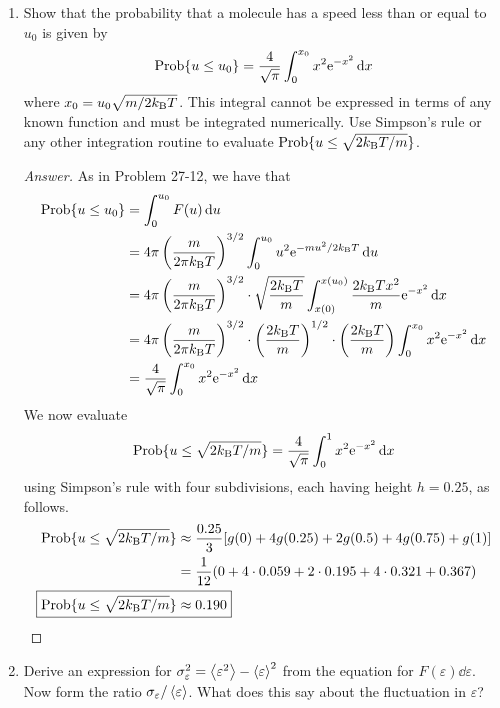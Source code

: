 \documentclass[../psets.tex]{subfiles}
\begin{document}
\begin{enumerate}[label={\textbf{27-\arabic*.}},leftmargin=3.5em]
\begin{proof}[Answer]
\begin{align*}
            \Aboxed{\sigma &= \SI{7.22e8}{\per\second}}
        \end{align*}
    \end{proof}
    \setcounter{enumi}{23}
    \item Show that the probability that a molecule has a speed less than or equal to $u_0$ is given by
    \begin{equation*}
        \Prob\{u\leq u_0\} = \frac{4}{\sqrt{\pi}}\int_0^{x_0}x^2\e[-x^2]\dd{x}
    \end{equation*}
    where $x_0=u_0\sqrt{m/2\kB T}$. This integral cannot be expressed in terms of any known function and must be integrated numerically. Use Simpson's rule or any other integration routine to evaluate $\Prob\{u\leq\sqrt{2\kB T/m}\}$.
    \begin{proof}[Answer]
        As in Problem 27-12, we have that
        \begin{align*}
            \Prob\{u\leq u_0\} &= \int_0^{u_0}F(u)\dd{u}\\
            &= 4\pi\left( \frac{m}{2\pi\kB T} \right)^{3/2}\int_0^{u_0}u^2\e[-mu^2/2\kB T]\dd{u}\\
            &= 4\pi\left( \frac{m}{2\pi\kB T} \right)^{3/2}\cdot\sqrt{\frac{2\kB T}{m}}\int_{x(0)}^{x(u_0)}\frac{2\kB Tx^2}{m}\e[-x^2]\dd{x}\\
            &= 4\pi\left( \frac{m}{2\pi\kB T} \right)^{3/2}\cdot\left( \frac{2\kB T}{m} \right)^{1/2}\cdot\left( \frac{2\kB T}{m} \right)\int_0^{x_0}x^2\e[-x^2]\dd{x}\\
            &= \frac{4}{\sqrt{\pi}}\int_0^{x_0}x^2\e[-x^2]\dd{x}
        \end{align*}
        We now evaluate
        \begin{equation*}
            \Prob\{u\leq\sqrt{2\kB T/m}\} = \frac{4}{\sqrt{\pi}}\int_0^1x^2\e[-x^2]\dd{x}
        \end{equation*}
        using Simpson's rule with four subdivisions, each having height $h=0.25$, as follows.
        \begin{align*}
            \Prob\{u\leq\sqrt{2\kB T/m}\} &\approx \frac{0.25}{3}[g(0)+4g(0.25)+2g(0.5)+4g(0.75)+g(1)]\\
            &= \frac{1}{12}(0+4\cdot 0.059+2\cdot 0.195+4\cdot 0.321+0.367)\\
            \Aboxed{\Prob\{u\leq\sqrt{2\kB T/m}\} &\approx 0.190}
        \end{align*}
    \end{proof}
    \setcounter{enumi}{26}
    \item Derive an expression for $\sigma_\varepsilon^2=\prb{\varepsilon^2}-\prb{\varepsilon}^2$ from the equation for $F(\varepsilon)\dd{\varepsilon}$. Now form the ratio $\sigma_\varepsilon/\prb{\varepsilon}$. What does this say about the fluctuation in $\varepsilon$?

\end{enumerate}
\end{document}
